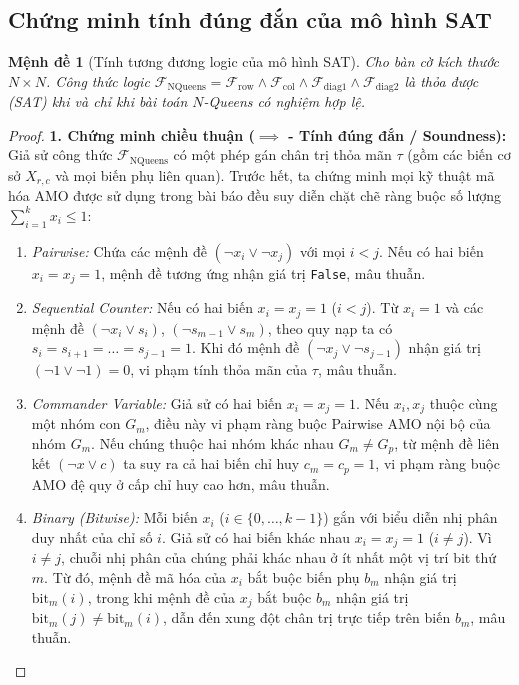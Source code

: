 \documentclass[a4paper,fleqn]{cas-sc}
\newtheorem{proposition}{Mệnh đề}
\begin{document}
\subsection{Chứng minh tính đúng đắn của mô hình SAT}
\begin{proposition}[Tính tương đương logic của mô hình SAT]
Cho bàn cờ kích thước $N \times N$. Công thức logic $\mathcal{F}_{\text{NQueens}} = \mathcal{F}_{\text{row}} \land \mathcal{F}_{\text{col}} \land \mathcal{F}_{\text{diag1}} \land \mathcal{F}_{\text{diag2}}$ là thỏa được (SAT) khi và chỉ khi bài toán $N$-Queens có nghiệm hợp lệ.
\end{proposition}
\begin{proof}
\noindent\textbf{1. Chứng minh chiều thuận ($\implies$ - Tính đúng đắn / Soundness):}\\
Giả sử công thức $\mathcal{F}_{\text{NQueens}}$ có một phép gán chân trị thỏa mãn $\tau$ (gồm các biến cơ sở $X_{r,c}$ và mọi biến phụ liên quan).
Trước hết, ta chứng minh mọi kỹ thuật mã hóa AMO được sử dụng trong bài báo đều suy diễn chặt chẽ ràng buộc số lượng $\sum_{i=1}^k x_i \le 1$:
\begin{enumerate}
    \item \textit{Pairwise:} Chứa các mệnh đề $(\neg x_i \lor \neg x_j)$ với mọi $i < j$. Nếu có hai biến $x_i = x_j = 1$, mệnh đề tương ứng nhận giá trị \texttt{False}, mâu thuẫn.
    \item \textit{Sequential Counter:} Nếu có hai biến $x_i = x_j = 1$ ($i < j$). Từ $x_i = 1$ và các mệnh đề $(\neg x_i \lor s_i)$, $(\neg s_{m-1} \lor s_m)$, theo quy nạp ta có $s_i = s_{i+1} = \dots = s_{j-1} = 1$. Khi đó mệnh đề $(\neg x_j \lor \neg s_{j-1})$ nhận giá trị $(\neg 1 \lor \neg 1) = 0$, vi phạm tính thỏa mãn của $\tau$, mâu thuẫn.
    \item \textit{Commander Variable:} Giả sử có hai biến $x_i = x_j = 1$. Nếu $x_i, x_j$ thuộc cùng một nhóm con $G_m$, điều này vi phạm ràng buộc Pairwise AMO nội bộ của nhóm $G_m$. Nếu chúng thuộc hai nhóm khác nhau $G_m \neq G_p$, từ mệnh đề liên kết $(\neg x \lor c)$ ta suy ra cả hai biến chỉ huy $c_m = c_p = 1$, vi phạm ràng buộc AMO đệ quy ở cấp chỉ huy cao hơn, mâu thuẫn.
    \item \textit{Binary (Bitwise):} Mỗi biến $x_i$ ($i \in \{0, \dots, k-1\}$) gắn với biểu diễn nhị phân duy nhất của chỉ số $i$. Giả sử có hai biến khác nhau $x_i = x_j = 1$ ($i \neq j$). Vì $i \neq j$, chuỗi nhị phân của chúng phải khác nhau ở ít nhất một vị trí bit thứ $m$. Từ đó, mệnh đề mã hóa của $x_i$ bắt buộc biến phụ $b_m$ nhận giá trị $\text{bit}_m(i)$, trong khi mệnh đề của $x_j$ bắt buộc $b_m$ nhận giá trị $\text{bit}_m(j) \neq \text{bit}_m(i)$, dẫn đến xung đột chân trị trực tiếp trên biến $b_m$, mâu thuẫn.

\end{enumerate}
\end{proof}
\end{document}
